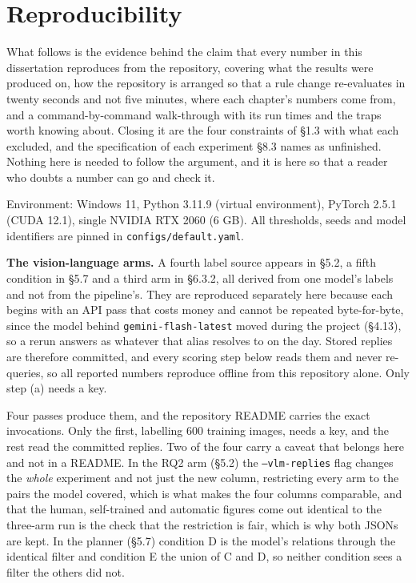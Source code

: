 


\chapter{Reproducibility}


What follows is the evidence behind the claim that every number in this dissertation reproduces from the repository, covering what the results were produced on, how the repository is arranged so that a rule change re-evaluates in twenty seconds and not five minutes, where each chapter's numbers come from, and a command-by-command walk-through with its run times and the traps worth knowing about. Closing it are the four constraints of \S{}1.3 with what each excluded, and the specification of each experiment \S{}8.3 names as unfinished. Nothing here is needed to follow the argument, and it is here so that a reader who doubts a number can go and check it.

Environment: Windows 11, Python 3.11.9 (virtual environment), PyTorch 2.5.1 (CUDA 12.1), single NVIDIA RTX 2060 (6 GB). All thresholds, seeds and model identifiers are pinned in \texttt{configs/default.yaml}.

\textbf{The vision-language arms.} A fourth label source appears in \S{}5.2, a fifth condition in \S{}5.7 and a third arm in \S{}6.3.2, all derived from one model's labels and not from the pipeline's. They are reproduced separately here because each begins with an API pass that costs money and cannot be repeated byte-for-byte, since the model behind \texttt{gemini-flash-latest} moved during the project (\S{}4.13), so a rerun answers as whatever that alias resolves to on the day. Stored replies are therefore committed, and every scoring step below reads them and never re-queries, so all reported numbers reproduce offline from this repository alone. Only step (a) needs a key.

Four passes produce them, and the repository README carries the exact invocations. Only the first, labelling 600 training images, needs a key, and the rest read the committed replies. Two of the four carry a caveat that belongs here and not in a README. In the RQ2 arm (\S{}5.2) the \texttt{--vlm-replies} flag changes the \textit{whole} experiment and not just the new column, restricting every arm to the pairs the model covered, which is what makes the four columns comparable, and that the human, self-trained and automatic figures come out identical to the three-arm run is the check that the restriction is fair, which is why both JSONs are kept. In the planner (\S{}5.7) condition D is the model's relations through the identical filter and condition E the union of C and D, so neither condition sees a filter the others did not.

